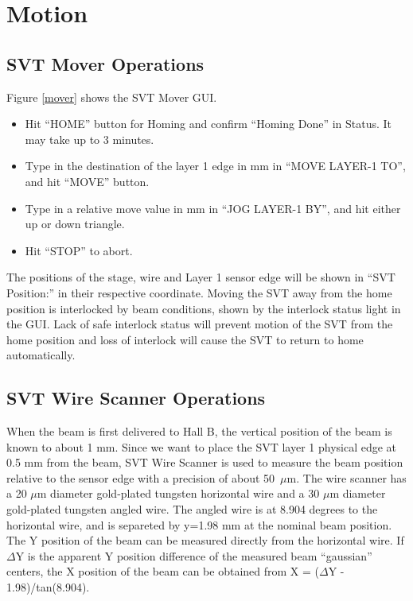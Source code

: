 \documentclass[12pt]{report}
\begin{document}


\section{Motion}

\subsection{SVT Mover Operations}

Figure \ref{mover} shows the SVT Mover GUI.

\begin{itemize}
\item
Hit ``HOME'' button for Homing and confirm ``Homing Done'' in Status. It may take up to 3 minutes.
\item
Type in the destination of the layer 1 edge in mm in ``MOVE LAYER-1 TO'', and hit ``MOVE'' button.
\item
Type in a relative move value in mm in ``JOG LAYER-1 BY'', and hit either up or down triangle.
\item
Hit ``STOP'' to abort.
\end{itemize}

The positions of the stage, wire and Layer 1 sensor edge will be shown in ``SVT Position:'' in their respective coordinate.  Moving the SVT away from the home position is interlocked by beam conditions, shown by the interlock status light in the GUI.  Lack of safe interlock status will prevent motion of the SVT from the home position and loss of interlock will cause the SVT to return to home automatically.

\subsection{SVT Wire Scanner Operations}
\label{sec:wirescan}

When the beam is first delivered to Hall B, the vertical position of the beam is known to about 1 mm. Since we want to place the SVT layer 1 physical edge at 0.5 mm from the beam, SVT Wire Scanner is used to measure the beam position relative to the sensor edge with a precision of about 50~$\mu$m. The wire scanner has a 20 $\mu$m diameter gold-plated tungsten horizontal wire and a 30 $\mu$m diameter gold-plated tungsten angled wire. The angled wire is at 8.904 degrees to the horizontal wire, and is separeted by y=1.98 mm at the nominal beam position. The Y position of the beam can be measured directly from the horizontal wire. If $\Delta$Y is the apparent Y position difference of the measured beam ``gaussian'' centers, the X position of the beam can be obtained from X = ($\Delta$Y - 1.98)/tan(8.904).      
\end{document}
